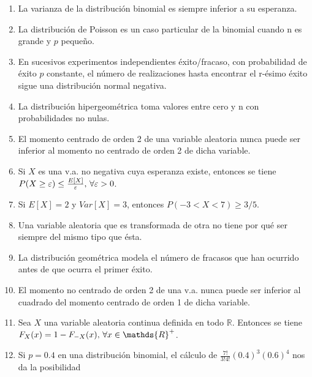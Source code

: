 \documentclass[fleqn]{article}
\def\R{\mathds{R}}
\begin{document}
\begin{enumerate}
                        \begin{enumerate}
                                \item La varianza de la distribución binomial es siempre inferior a su esperanza.
                                \item La distribución de Poisson es un caso particular de la binomial cuando n es grande y $p$ pequeño.
                                \item En sucesivos experimentos independientes éxito/fracaso, con probabilidad de éxito $p$ constante,
                                        el número de realizaciones hasta encontrar el r-ésimo éxito sigue una distribución normal negativa.
                                \item La distribución hipergeométrica toma valores entre cero y n con probabilidades no nulas.
                                \item El momento centrado de orden 2 de una variable aleatoria nunca puede ser inferior al momento no centrado
                                        de orden 2 de dicha variable.
                                \item Si $X$ es una v.a. no negativa cuya esperanza existe, entonces se tiene
                                        $P(X\geq \varepsilon) \leq \frac{E[X]}{\varepsilon}, \thinspace \forall \varepsilon >0$.
                                \item Si $E[X] = 2$ y $Var[X] = 3$, entonces $P(-3 < X < 7) \geq 3/5$.
                                \item Una variable aleatoria que es transformada de otra no tiene por qué ser siempre del mismo tipo que ésta.
                                \item La distribución geométrica modela el número de fracasos que han ocurrido antes de que ocurra el primer éxito.
                                \item El momento no centrado de orden 2 de una v.a. nunca puede ser inferior al cuadrado del momento centrado de 
                                        orden 1 de dicha variable.
                                \item Sea $X$ una variable aleatoria continua definida en todo $\R$. Entonces se tiene 
                                        $F_X (x) = 1 - F_{-X} (x), \thinspace \forall x \in \R^+$.
                                \item Si $p=0.4$ en una distribución binomial, el cálculo de $\frac{7!}{3! 4!} (0.4)^3 (0.6)^4$ nos da la posibilidad 

\end{enumerate}
\end{enumerate}
\end{document}
